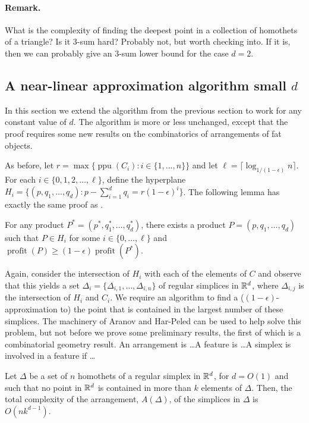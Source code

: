\documentclass[lotsofwhite]{patmorin}
\newcommand{\ppu}{\operatorname{ppu}}
\newcommand{\val}{\operatorname{profit}}
\newcommand{\eps}{\epsilon}
\begin{document}
\paragraph{Remark.} What is the complexity of finding the deepest
point in a collection of homothets of a triangle?  Is it 3-sum hard?
Probably not, but worth checking into.  If it is, then we can probably
give an 3-sum lower bound for the case $d=2$.

\subsection{A near-linear approximation algorithm small $d$}

In this section we extend the algorithm from the previous section to work
for any constant value of $d$.  The algorithm is more or less unchanged,
except that the proof requires some new results on the combinatorics of
arrangements of fat objects.

As before, let $r=\max\{\ppu(C_i) : i\in\{1,\ldots, n\}\}$ and let $\ell =
\lceil\log_{1/(1-\eps)} n\rceil$. For each $i\in\{0,1,2,\ldots,\ell\}$,
define the hyperplane $H_i = \{ (p,q_1,\ldots,q_d) : p-\sum_{i=1}^d
q_i =  r(1-\eps)^i \}$.  The following lemma has exactly the same proof
as .

\begin{lem}
  For any product $P^*=(p^*,q_1^*,\ldots,q_d^*)$, there exists
  a product $P=(p,q_1,\ldots,q_d)$ such that $P\in H_i$ for some
  $i\in\{0,\ldots,\ell\}$ and $\val(P) \ge (1-\eps)\val(P^*)$.
\end{lem}

Again, consider the intersection of $H_i$ with each
of the elements of $C$ and observe that this yields a set
$\Delta_i=\{\Delta_{i,1},\ldots,\Delta_{i,n}\}$ of regular simplices in
$\mathbb{R}^d$, where $\Delta_{i,j}$ is the intersection of $H_i$ and $C_i$.
We require an algorithm to find a ($(1-\eps)$-approximation to) the
point that is contained in the largest number of these simplices.
The machinery of Aranov and Har-Peled can be used to help solve this
problem, but not before we prove some preliminary results, the first of
which is a combinatorial geometry result.  An arrangement is \ldots A
feature is \ldots A simplex is involved in a feature if \ldots

\begin{lem}
Let $\Delta$ be a set of $n$ homothets of a regular simplex in $\mathbb{R}^d$, for
$d=O(1)$ and such that no point in $\mathbb{R}^d$ is contained in more than $k$
elements of $\Delta$.  Then, the total complexity of the arrangement,
$A(\Delta)$, of the simplices in $\Delta$ is $O(nk^{d-1})$.
\end{lem}
\end{document}
